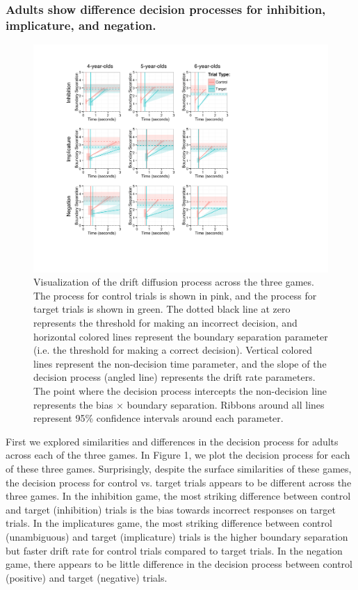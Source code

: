 \documentclass[10pt,letterpaper]{article}
\begin{document}
\subsubsection{Adults show difference decision processes for inhibition, implicature, and negation.}

\begin{figure}
\begin{center} 
\includegraphics[width=6in]{figures/ddm_vis.pdf}
\caption{\label{fig:ddm} Visualization of the drift diffusion process across the three games.  The process for control trials is shown in pink, and the process for target trials is shown in green.  The dotted black line at zero represents the threshold for making an incorrect decision, and horizontal colored lines represent the boundary separation parameter (i.e. the threshold for making a correct decision).  Vertical colored lines represent the non-decision time parameter, and the slope of the decision process (angled line) represents the drift rate parameters.  The point where the decision process intercepts the non-decision line represents the bias $\times$ boundary separation.  Ribbons around all lines represent 95\% confidence intervals around each parameter.}
\end{center} 
\end{figure}

First we explored similarities and differences in the decision process for adults across each of the three games.  In Figure 1, we plot the decision process for each of these three games.  Surprisingly, despite the surface similarities of these games, the decision process for control vs. target trials appears to be different across the three games.  In the inhibition game, the most striking difference between control and target (inhibition) trials is the bias towards incorrect responses on target trials.  In the implicatures game, the most striking difference between control (unambiguous) and target (implicature) trials is the higher boundary separation but faster drift rate for control trials compared to target trials.  In the negation game, there appears to be little difference in the decision process between control (positive) and target (negative) trials.
\end{document}
